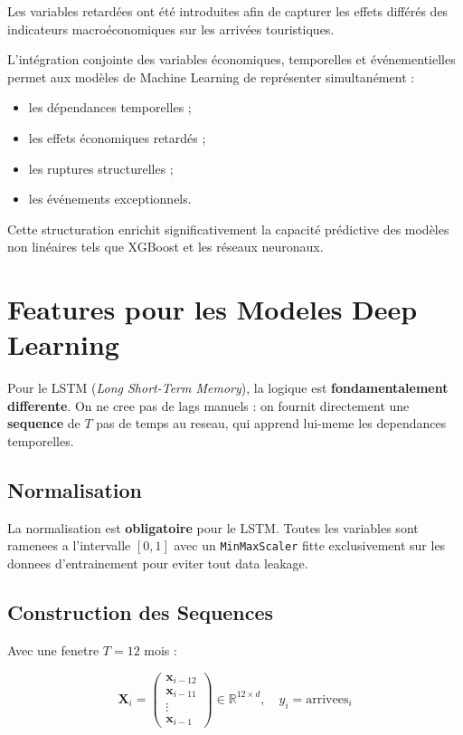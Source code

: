 \documentclass[12pt,a4paper]{report}
\begin{document}
\begin{itemize}[leftmargin=1.5em]
Les variables retardées ont été introduites afin de
capturer les effets différés des indicateurs macroéconomiques
sur les arrivées touristiques.

L’intégration conjointe des variables économiques,
temporelles et événementielles permet aux modèles
de Machine Learning de représenter simultanément :

\begin{itemize}[leftmargin=1.5em]
\item les dépendances temporelles ;
\item les effets économiques retardés ;
\item les ruptures structurelles ;
\item les événements exceptionnels.
\end{itemize}

Cette structuration enrichit significativement la capacité
prédictive des modèles non linéaires tels que XGBoost
et les réseaux neuronaux.

\section{Features pour les Modeles Deep Learning}

Pour le LSTM (\textit{Long Short-Term Memory}), la logique est
\textbf{fondamentalement differente}. On ne cree pas de lags manuels :
on fournit directement une \textbf{sequence} de $T$ pas de temps
au reseau, qui apprend lui-meme les dependances temporelles.

\subsection{Normalisation}

La normalisation est \textbf{obligatoire} pour le LSTM. Toutes les
variables sont ramenees a l'intervalle $[0, 1]$ avec un
\texttt{MinMaxScaler} fitte exclusivement sur les donnees d'entrainement
pour eviter tout data leakage.

\subsection{Construction des Sequences}

Avec une fenetre $T = 12$ mois :

\[
\mathbf{X}_i = \begin{pmatrix}
  \mathbf{x}_{i-12} \\ \mathbf{x}_{i-11} \\ \vdots \\ \mathbf{x}_{i-1}
\end{pmatrix} \in \mathbb{R}^{12 \times d}, \quad
y_i = \text{arrivees}_{i}
\]


\end{itemize}
\end{document}
